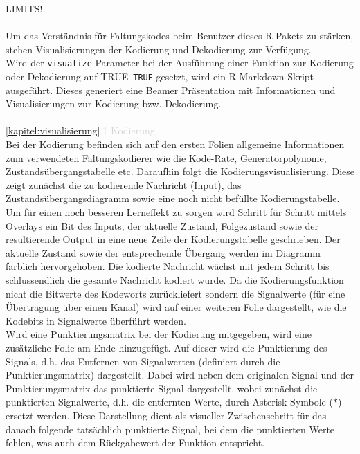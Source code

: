 LIMITS!\\\\
Um das Verständnis für Faltungskodes beim Benutzer dieses R-Pakets zu stärken, stehen Visualisierungen der Kodierung und Dekodierung zur Verfügung.
\\
Wird der \texttt{visualize} Parameter bei der Ausführung einer Funktion zur Kodierung oder Dekodierung auf TRUE~\texttt{TRUE} gesetzt, wird ein R Markdown Skript ausgeführt. Dieses generiert eine Beamer Präsentation mit Informationen und Visualisierungen zur Kodierung bzw. Dekodierung.
\\\\
\textcolor{lightgray}{\ref{kapitel:visualisierung}.1 Kodierung}\\
Bei der Kodierung befinden sich auf den ersten Folien allgemeine Informationen zum verwendeten Faltungskodierer wie die Kode-Rate, Generatorpolynome, Zustandsübergangstabelle etc. 
Daraufhin folgt die Kodierungsvisualisierung. Diese zeigt zunächst die zu kodierende Nachricht (Input), das Zustandsübergangsdiagramm sowie eine noch nicht befüllte Kodierungstabelle. Um für einen noch besseren Lerneffekt zu sorgen wird Schritt für Schritt mittels Overlays ein Bit des Inputs, der aktuelle Zustand, Folgezustand sowie der resultierende Output in eine neue Zeile der Kodierungstabelle geschrieben. Der aktuelle Zustand sowie der entsprechende Übergang werden im Diagramm farblich hervorgehoben. Die kodierte Nachricht wächst mit jedem Schritt bis schlussendlich die gesamte Nachricht kodiert wurde.
Da die Kodierungsfunktion nicht die Bitwerte des Kodeworts zurückliefert sondern die Signalwerte (für eine Übertragung über einen Kanal) wird auf einer weiteren Folie dargestellt, wie die Kodebits in Signalwerte überführt werden.\\
Wird eine Punktierungsmatrix bei der Kodierung mitgegeben, wird eine zusätzliche Folie am Ende hinzugefügt. Auf dieser wird die Punktierung des Signals, d.h. das Entfernen von Signalwerten (definiert durch die Punktierungsmatrix) dargestellt. Dabei wird neben dem originalen Signal und der Punktierungsmatrix das punktierte Signal dargestellt, wobei zunächst die punktierten Signalwerte, d.h. die entfernten Werte, durch Asterisk-Symbole ($\ast$) ersetzt werden. Diese Darstellung dient als visueller Zwischenschritt für das danach folgende tatsächlich punktierte Signal, bei dem die punktierten Werte fehlen, was auch dem Rückgabewert der Funktion entspricht.
